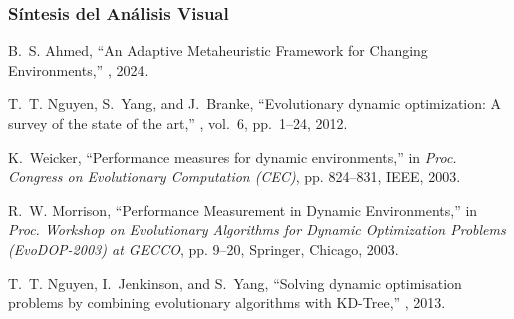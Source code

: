 \documentclass[10pt]{article}
\begin{document}
\subsubsection*{Síntesis del Análisis Visual}




\begin{thebibliography}{99}

B.~S. Ahmed,
\newblock ``An Adaptive Metaheuristic Framework for Changing Environments,''
, 2024.

T.~T. Nguyen, S.~Yang, and J.~Branke,
\newblock ``Evolutionary dynamic optimization: A survey of the state of the art,''
, vol.~6, pp.~1--24, 2012.

K.~Weicker,
\newblock ``Performance measures for dynamic environments,''
\newblock in {\em Proc. Congress on Evolutionary Computation (CEC)}, pp. 824--831, IEEE, 2003.

R.~W. Morrison,
\newblock ``Performance Measurement in Dynamic Environments,''
\newblock in {\em Proc. Workshop on Evolutionary Algorithms for Dynamic Optimization Problems (EvoDOP-2003) at GECCO}, pp. 9--20, Springer, Chicago, 2003.

T.~T. Nguyen, I.~Jenkinson, and S.~Yang,
\newblock ``Solving dynamic optimisation problems by combining evolutionary algorithms with KD-Tree,''
, 2013.

\end{thebibliography}
\end{document}
